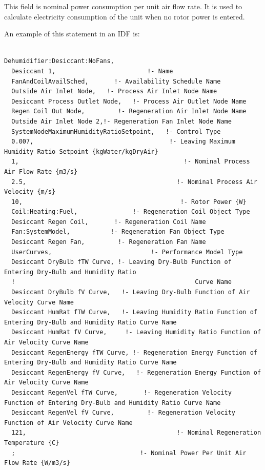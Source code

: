 This field is nominal power consumption per unit air flow rate. It is used to calculate electricity consumption of the unit when no rotor power is entered.

An example of this statement in an IDF is:

\begin{lstlisting}

Dehumidifier:Desiccant:NoFans,
  Desiccant 1,                         !- Name
  FanAndCoilAvailSched,       !- Availability Schedule Name
  Outside Air Inlet Node,   !- Process Air Inlet Node Name
  Desiccant Process Outlet Node,   !- Process Air Outlet Node Name
  Regen Coil Out Node,         !- Regeneration Air Inlet Node Name
  Outside Air Inlet Node 2,!- Regeneration Fan Inlet Node Name
  SystemNodeMaximumHumidityRatioSetpoint,   !- Control Type
  0.007,                                     !- Leaving Maximum Humidity Ratio Setpoint {kgWater/kgDryAir}
  1,                                             !- Nominal Process Air Flow Rate {m3/s}
  2.5,                                         !- Nominal Process Air Velocity {m/s}
  10,                                           !- Rotor Power {W}
  Coil:Heating:Fuel,               !- Regeneration Coil Object Type
  Desiccant Regen Coil,       !- Regeneration Coil Name
  Fan:SystemModel,           !- Regeneration Fan Object Type
  Desiccant Regen Fan,         !- Regeneration Fan Name
  UserCurves,                           !- Performance Model Type
  Desiccant DryBulb fTW Curve, !- Leaving Dry-Bulb Function of Entering Dry-Bulb and Humidity Ratio
  !                                                 Curve Name
  Desiccant DryBulb fV Curve,   !- Leaving Dry-Bulb Function of Air Velocity Curve Name
  Desiccant HumRat fTW Curve,   !- Leaving Humidity Ratio Function of Entering Dry-Bulb and Humidity Ratio Curve Name
  Desiccant HumRat fV Curve,     !- Leaving Humidity Ratio Function of Air Velocity Curve Name
  Desiccant RegenEnergy fTW Curve, !- Regeneration Energy Function of Entering Dry-Bulb and Humidity Ratio Curve Name
  Desiccant RegenEnergy fV Curve,   !- Regeneration Energy Function of Air Velocity Curve Name
  Desiccant RegenVel fTW Curve,       !- Regeneration Velocity Function of Entering Dry-Bulb and Humidity Ratio Curve Name
  Desiccant RegenVel fV Curve,         !- Regeneration Velocity Function of Air Velocity Curve Name
  121,                                         !- Nominal Regeneration Temperature {C}
  ;                                  !- Nominal Power Per Unit Air Flow Rate {W/m3/s}
\end{lstlisting}

